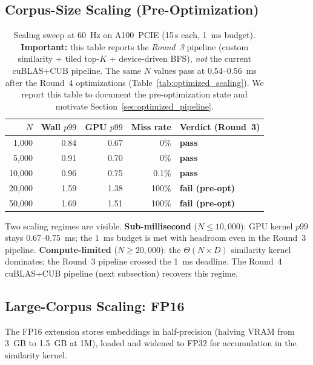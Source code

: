 \documentclass[11pt]{article}
\begin{document}
\subsection{Corpus-Size Scaling (Pre-Optimization)}
\label{sec:scaling_preopt}

\begin{table}[ht]
\centering
\small
\caption{Scaling sweep at 60~Hz on A100~PCIE (15\,s each, 1~ms budget).
\textbf{Important:} this table reports the \emph{Round~3} pipeline
(custom similarity + tiled top-$K$ + device-driven BFS), \emph{not}
the current cuBLAS+CUB pipeline. The same $N$ values pass at
0.54--0.56~ms after the Round~4 optimizations
(Table~\ref{tab:optimized_scaling}). We report this table to
document the pre-optimization state and motivate
Section~\ref{sec:optimized_pipeline}.}
\label{tab:scaling}
\begin{tabular}{rrrrl}
\toprule
\textbf{$N$} & \textbf{Wall $p99$} & \textbf{GPU $p99$} & \textbf{Miss rate} & \textbf{Verdict (Round~3)} \\
\midrule
 1{,}000 & 0.84 & 0.67 &    0\% & \textbf{pass} \\
 5{,}000 & 0.91 & 0.70 &    0\% & \textbf{pass} \\
10{,}000 & 0.96 & 0.75 &  0.1\% & \textbf{pass} \\
20{,}000 & 1.59 & 1.38 &  100\% & \textbf{fail (pre-opt)} \\
50{,}000 & 1.69 & 1.51 &  100\% & \textbf{fail (pre-opt)} \\
\bottomrule
\end{tabular}
\end{table}

Two scaling regimes are visible. \textbf{Sub-millisecond}
($N \leq 10{,}000$): GPU kernel $p99$ stays 0.67--0.75~ms; the 1~ms
budget is met with headroom even in the Round~3 pipeline.
\textbf{Compute-limited} ($N \geq 20{,}000$): the $\Theta(N \times D)$
similarity kernel dominates; the Round~3 pipeline crossed the 1~ms
deadline. The Round~4 cuBLAS+CUB pipeline (next subsection) recovers
this regime.

\subsection{Large-Corpus Scaling: FP16}
\label{sec:fp16scaling}

The FP16 extension stores embeddings in half-precision (halving VRAM
from 3~GB to 1.5~GB at 1M), loaded and widened to FP32 for
accumulation in the similarity kernel.
\end{document}
